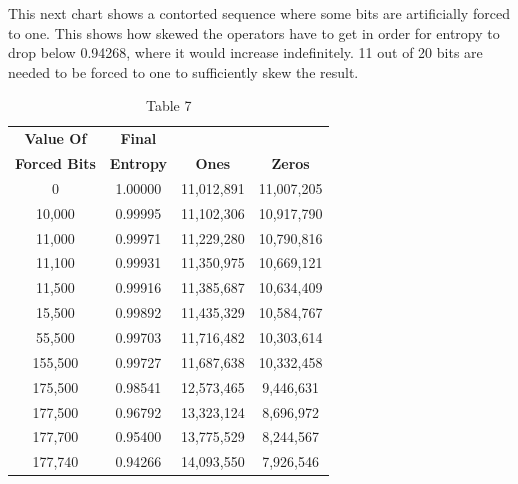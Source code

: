 \documentclass[preprint]{sigplanconf}
\begin{document}
This next chart shows a contorted sequence where some bits are artificially forced to one. This shows how skewed the operators have to get in order for entropy to drop below 0.94268, where it would increase indefinitely. 11 out of 20 bits are needed to be forced to one to sufficiently skew the result.

\begin{table}
    \begin{center}
        \begin{tabular}{|c|c|c|c|}
            \hline
            \textbf{Value Of}    & \textbf{Final}   &               &                \\
            \textbf{Forced Bits} & \textbf{Entropy} & \textbf{Ones} & \textbf{Zeros} \\
            \hline
            0                    & 1.00000          & 11,012,891    & 11,007,205     \\
            10,000               & 0.99995          & 11,102,306    & 10,917,790     \\
            11,000               & 0.99971          & 11,229,280    & 10,790,816     \\
            11,100               & 0.99931          & 11,350,975    & 10,669,121     \\
            11,500               & 0.99916          & 11,385,687    & 10,634,409     \\
            15,500               & 0.99892          & 11,435,329    & 10,584,767     \\
            55,500               & 0.99703          & 11,716,482    & 10,303,614     \\
            155,500              & 0.99727          & 11,687,638    & 10,332,458     \\
            175,500              & 0.98541          & 12,573,465    & 9,446,631      \\
            177,500              & 0.96792          & 13,323,124    & 8,696,972      \\
            177,700              & 0.95400          & 13,775,529    & 8,244,567      \\
            177,740              & 0.94266          & 14,093,550    & 7,926,546      \\
            \hline
        \end{tabular}
        \caption{Table 7}
        \label{tab-7}
    \end{center}
\end{table}
\end{document}
